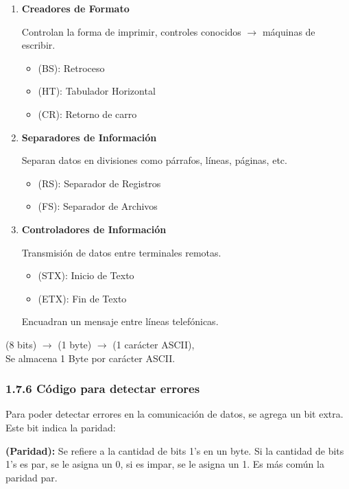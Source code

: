 \begin{enumerate} \item \textbf{Creadores de Formato}

          Controlan la forma de imprimir, controles conocidos $\rightarrow$ m\'{a}quinas
          de escribir. \begin{itemize} \item (BS): Retroceso \item (HT): Tabulador
                    Horizontal \item (CR): Retorno de carro \end{itemize}

    \item \textbf{Separadores de Informaci\'{o}n}

          Separan datos en divisiones como p\'{a}rrafos, l\'{i}neas, p\'{a}ginas, etc.
          \begin{itemize} \item (RS): Separador de Registros \item (FS): Separador de
                    Archivos \end{itemize}

    \item \textbf{Controladores de Informaci\'{o}n}

          Transmisi\'{o}n de datos entre terminales remotas. \begin{itemize} \item (STX):
                    Inicio de Texto \item (ETX): Fin de Texto \end{itemize}

          Encuadran un mensaje entre l\'{i}neas telef\'{o}nicas. \end{enumerate} (8
bits) $\rightarrow$ (1 byte) $\rightarrow$ (1 car\'{a}cter ASCII), \\ Se
almacena 1 Byte por car\'{a}cter ASCII.

\subsubsection*{1.7.6 C\'{o}digo para detectar errores}

Para poder detectar errores en la comunicaci\'{o}n de datos, se agrega un bit
extra. Este bit indica la paridad:

\textbf{(Paridad):} Se refiere a la cantidad de bits 1's en un byte. Si la
cantidad de bits 1's es par, se le asigna un 0, si es impar, se le asigna un 1.
Es m\'{a}s com\'{u}n la paridad par.

